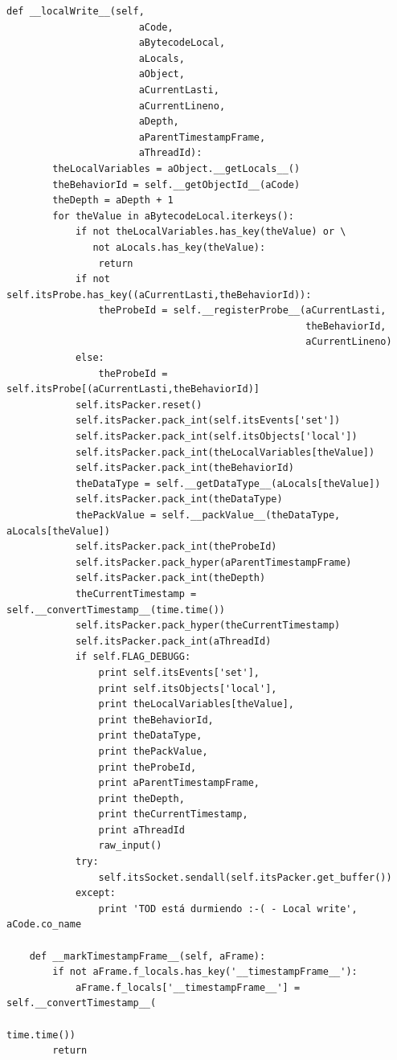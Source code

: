 \documentclass[12pt,legalpaper]{report}
\begin{document}
\begin{singlespace}
\begin{lstlisting}[style=Python]
    def __localWrite__(self,
                       aCode,
                       aBytecodeLocal,
                       aLocals,
                       aObject,
                       aCurrentLasti,
                       aCurrentLineno,
                       aDepth,
                       aParentTimestampFrame, 
                       aThreadId):
        theLocalVariables = aObject.__getLocals__()
        theBehaviorId = self.__getObjectId__(aCode)
        theDepth = aDepth + 1
        for theValue in aBytecodeLocal.iterkeys():
            if not theLocalVariables.has_key(theValue) or \
               not aLocals.has_key(theValue):
                return
            if not self.itsProbe.has_key((aCurrentLasti,theBehaviorId)):
                theProbeId = self.__registerProbe__(aCurrentLasti,
                                                    theBehaviorId,
                                                    aCurrentLineno)
            else:
                theProbeId = self.itsProbe[(aCurrentLasti,theBehaviorId)]
            self.itsPacker.reset()
            self.itsPacker.pack_int(self.itsEvents['set'])
            self.itsPacker.pack_int(self.itsObjects['local'])
            self.itsPacker.pack_int(theLocalVariables[theValue])
            self.itsPacker.pack_int(theBehaviorId)
            theDataType = self.__getDataType__(aLocals[theValue])
            self.itsPacker.pack_int(theDataType)
            thePackValue = self.__packValue__(theDataType, aLocals[theValue])
            self.itsPacker.pack_int(theProbeId)
            self.itsPacker.pack_hyper(aParentTimestampFrame)
            self.itsPacker.pack_int(theDepth)
            theCurrentTimestamp = self.__convertTimestamp__(time.time()) 
            self.itsPacker.pack_hyper(theCurrentTimestamp)
            self.itsPacker.pack_int(aThreadId)
            if self.FLAG_DEBUGG:            
                print self.itsEvents['set'],
                print self.itsObjects['local'],
                print theLocalVariables[theValue],
                print theBehaviorId,
                print theDataType,
                print thePackValue,
                print theProbeId,
                print aParentTimestampFrame,
                print theDepth,
                print theCurrentTimestamp,
                print aThreadId
                raw_input()
            try:
                self.itsSocket.sendall(self.itsPacker.get_buffer())
            except:
                print 'TOD está durmiendo :-( - Local write', aCode.co_name            
    
    def __markTimestampFrame__(self, aFrame):
        if not aFrame.f_locals.has_key('__timestampFrame__'): 
            aFrame.f_locals['__timestampFrame__'] = self.__convertTimestamp__(
                                                                  time.time())
        return


\end{lstlisting}
\end{singlespace}
\end{document}
